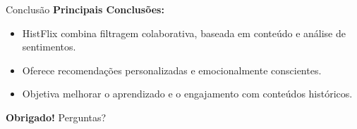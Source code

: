 \documentclass{beamer}
\begin{document}
\begin{frame}{Conclusão}
    \textbf{Principais Conclusões:}
    \begin{itemize}
        \item HistFlix combina filtragem colaborativa, baseada em conteúdo e análise de sentimentos.
        \item Oferece recomendações personalizadas e emocionalmente conscientes.
        \item Objetiva melhorar o aprendizado e o engajamento com conteúdos históricos.
    \end{itemize}
    \vspace{0.5cm}
    \textbf{Obrigado!}
    \vspace{0.5cm}
    Perguntas?
\end{frame}
\end{document}
